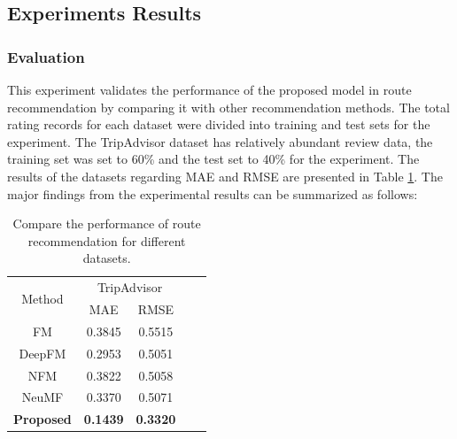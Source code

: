\documentclass[]{article}
\begin{document}
\subsection{Experiments Results}
\subsubsection{Evaluation}
This experiment validates the performance of the proposed model in route recommendation by comparing it with other recommendation methods. The total rating records for each dataset were divided into training and test sets for the experiment. The TripAdvisor dataset has relatively abundant review data, the training set was set to 60\% and the test set to 40\% for the experiment. The results of the datasets regarding MAE and RMSE are presented in Table \ref{sec6:results1}. The major findings from the experimental results can be summarized as follows:

\begin{table}[htbp!]
	\centering
	\setlength{\tabcolsep}{12pt}
	\renewcommand{\arraystretch}{1.4}
	\caption{Compare the performance of route recommendation for different datasets.}
	\label{sec6:results1}
	\begin{tabular}{ccccc}
		\toprule
		\multirow{2}{*}{Method} & \multicolumn{2}{c}{TripAdvisor} \\
		& MAE             & RMSE           \\
		\midrule
		FM                      & 0.3845          & 0.5515            \\
		DeepFM                  & 0.2953          & 0.5051      	\\
		NFM                     & 0.3822          & 0.5058      \\
		NeuMF                   & 0.3370          & 0.5071       \\
		\textbf{Proposed}       & \textbf{0.1439} & \textbf{0.3320} \\
		\bottomrule
	\end{tabular}
\end{table}
\end{document}
